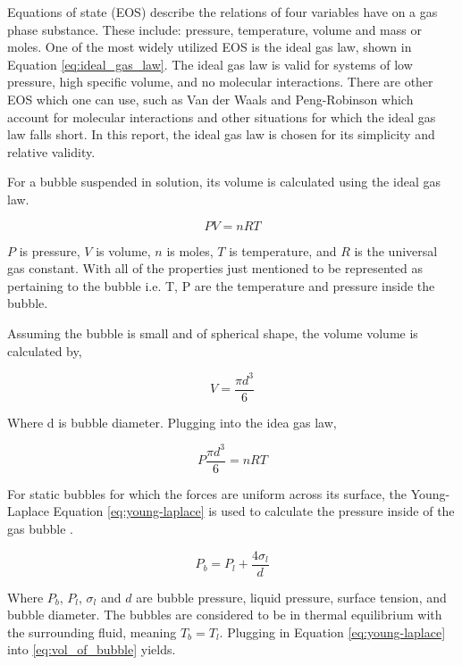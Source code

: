 Equations of state (EOS) describe the relations of four variables have on a gas phase substance. These include: pressure, temperature, volume and mass or moles. One of the most widely utilized EOS is the ideal gas law, shown in Equation \ref{eq:ideal_gas_law}. The ideal gas law is valid for systems of low pressure, high specific volume, and no molecular interactions. There are other EOS which one can use, such as Van der Waals and Peng-Robinson which account for molecular interactions and other situations for which the ideal gas law falls short. In this report, the ideal gas law is chosen for its simplicity and relative validity. 

For a bubble suspended in solution, its volume is calculated using the ideal gas law.

 \begin{equation}
	PV = nRT
	\label{eq:ideal_gas_law}
\end{equation}

$P$ is pressure, $V$ is volume, $n$ is moles, $T$ is temperature, and $R$ is the universal gas constant. With all of the properties just mentioned to be represented as pertaining to the bubble i.e. T, P are the temperature and pressure inside the bubble.

Assuming the bubble is small and of spherical shape, the volume volume is calculated by,
 
 \begin{equation}
	V = \frac{\pi d^{3}}{6}
	\label{eq:vol_of_sphere}
\end{equation}

Where d is bubble diameter. Plugging into the idea gas law, 

 \begin{equation}
	P \frac{\pi d^{3}}{6} = nRT
	\label{eq:vol_of_bubble}
\end{equation}

For static bubbles for which the forces are uniform across its surface, the Young-Laplace Equation \ref{eq:young-laplace} is used to calculate the pressure inside of the gas bubble \cite{deen2016}. 

 \begin{equation}
 	P_{b} = P_{l} + \frac{4 \sigma_{l}}{d}
	\label{eq:young-laplace}
\end{equation}

Where $P_{b}$, $P_{l}$, $\sigma_{l}$ and $d$ are bubble pressure, liquid pressure, surface tension, and bubble diameter. The bubbles are considered to be in thermal equilibrium with the surrounding fluid, meaning $T_{b} = T_{l}$.  Plugging in Equation \ref{eq:young-laplace} into \ref{eq:vol_of_bubble} yields.

